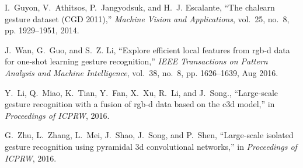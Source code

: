 \documentclass[10pt, a4paper, conference]{IEEEtran}
\begin{document}
\begin{thebibliography}{10}
I.~Guyon, V.~Athitsos, P.~Jangyodsuk, and H.~J. Escalante, ``The chalearn
  gesture dataset ({CGD} 2011),'' \emph{Machine Vision and Applications},
  vol.~25, no.~8, pp. 1929--1951, 2014.

J.~Wan, G.~Guo, and S.~Z. Li, ``Explore efficient local features from rgb-d
  data for one-shot learning gesture recognition,'' \emph{IEEE Transactions on
  Pattern Analysis and Machine Intelligence}, vol.~38, no.~8, pp. 1626--1639,
  Aug 2016.

Y.~Li, Q.~Miao, K.~Tian, Y.~Fan, X.~Xu, R.~Li, and J.~Song., ``Large-scale
  gesture recognition with a fusion of rgb-d data based on the c3d model,'' in
  \emph{Proceedings of ICPRW}, 2016.

G.~Zhu, L.~Zhang, L.~Mei, J.~Shao, J.~Song, and P.~Shen, ``Large-scale isolated
  gesture recognition using pyramidal 3d convolutional networks,'' in
  \emph{Proceedings of ICPRW}, 2016.

\end{thebibliography}
\end{document}
